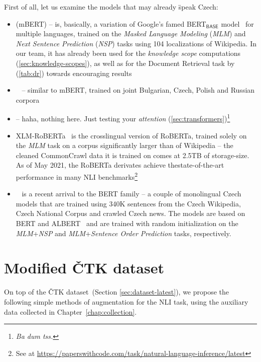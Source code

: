 First of all, let us examine the models that may already \"{speak} Czech: 
\begin{itemize} 
    \item {} ({\techbf mBERT}) -- is, basically, a variation of \textsf{Google}'s famed \textsf{BERT}$_\textsf{BASE}$ model~\cite{devlin2019bert} for multiple languages, trained on the \textit{Masked Language Modeling} (\textit{MLM}) and \textit{Next Sentence Prediction} (\textit{NSP}) tasks using 104 localizations of \textsf{Wikipedia}. In our team, it has already been used for the \textit{knowledge scope} computations (\ref{sec:knowledge-scopes}), as well as for the Document Retrieval task by~\cite{rypar,michal} (\ref{tab:dr}) towards encouraging results
    
    \item {}~\cite{slavicbert} -- similar to \textsf{mBERT}, trained on joint Bulgarian, Czech, Polish and Russian corpora
   
   \item {} -- haha, nothing here. Just testing your \textit{attention} (\ref{sec:transformers})\footnote{\textit{Ba dum tss.}}
   \item {\techbf XLM-RoBERTa}~\cite{xlm-roberta} is the crosslingual version of \textsf{RoBERTa}, trained solely on the \textit{MLM} task on a corpus significantly larger than of \textsf{Wikipedia} -- the cleaned \textsf{CommonCrawl} data it is trained on comes at 2.5TB of storage-size. As of May 2021, the \textsf{RoBERTa} derivates achieve thestate-of-the-art performance in many NLI benchmarks\footnote{See at \url{https://paperswithcode.com/task/natural-language-inference/latest}}
    \item {}~\cite{czert} is a recent arrival to the \textsf{BERT} family -- a couple of monolingual Czech models that are trained using 340K sentences from the Czech \textsf{Wikipedia}, \textsf{Czech National Corpus} and crawled Czech news. The models are based on \textsf{BERT} and \textsf{ALBERT}~\cite{albert} and are trained with random initialization on the \textit{MLM}+\textit{NSP} and \textit{MLM}+\textit{Sentence Order Prediction} tasks, respectively.
\end{itemize}
\section{Modified ČTK dataset}
\label{sec:modified-ctk}
On top of the \textsf{ČTK} dataset~(Section \ref{sec:dataset-latest}), we propose the following simple methods of augmentation for the NLI task, using the auxiliary data collected in Chapter~\ref{chap:collection}.

